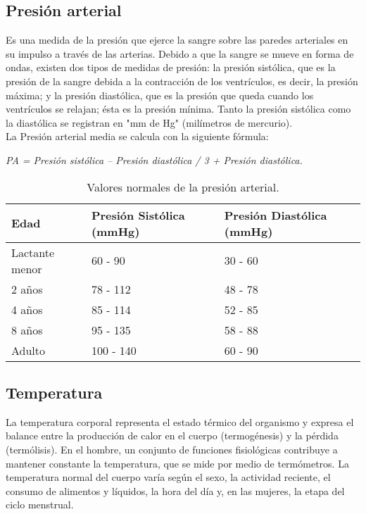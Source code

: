 	\subsection{Presión arterial}
	Es una medida de la presión que ejerce la sangre sobre las paredes arteriales en su impulso a través de las arterias. Debido a que la sangre se mueve en forma de ondas, existen dos tipos de medidas de presión: la presión sistólica, que es la presión de la sangre debida a la contracción de los ventrículos, es decir, la presión máxima; y la presión diastólica, que es la presión que queda cuando los ventrículos se relajan; ésta es la presión mínima. Tanto la presión sistólica como la diastólica se registran en "mm de Hg" (milímetros de mercurio). \cite{valoresUNAM} \cite{aguayoChile} \cite{signosvitales2016} \\
	
	La Presión arterial media se calcula con la siguiente fórmula: 
	
	\begin{center}
		\textit{PA = Presión sistólica – Presión diastólica / 3 + Presión diastólica.}
	\end{center}
	
	\begin{table}[htbp]
		\begin{center}
			\begin{tabular}{|l|l|l|}
				\hline
				\textbf{Edad} & \textbf{Presión Sistólica (mmHg)} & \textbf{Presión Diastólica (mmHg)} \\
				\hline \hline
				Lactante menor & 60 - 90 & 30 - 60 \\
				\hline
				2 años  & 78 - 112 & 48 - 78 \\
				\hline
				4 años & 85 - 114 & 52 - 85 \\
				\hline
				8 años & 95 - 135 & 58 - 88 \\
				\hline
				Adulto & 100 - 140 & 60 - 90 \\
				\hline
			\end{tabular}
			\caption{Valores normales de la presión arterial.}
		\end{center}
	\end{table}
	
	\subsection{Temperatura}
	La temperatura corporal representa el estado térmico del organismo y expresa el balance entre la producción de calor en el cuerpo (termogénesis) y la pérdida (termólisis). En el hombre, un conjunto de funciones fisiológicas contribuye a mantener constante la temperatura, que se mide por medio de termómetros. La temperatura normal del cuerpo varía según el sexo, la actividad reciente, el consumo de alimentos y líquidos, la hora del día y, en las mujeres, la etapa del ciclo menstrual. \cite{cobo2011} \cite{signosvitales2016}
	
